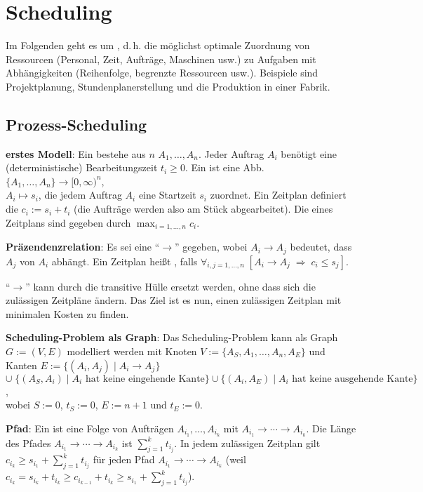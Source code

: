 \section{%
    Scheduling%
}

Im Folgenden geht es um , d.\,h. die möglichst optimale Zuordnung von
Ressourcen (Personal, Zeit, Aufträge, Maschinen usw.) zu Aufgaben mit
Abhängigkeiten (Reihenfolge, begrenzte Ressourcen usw.).
Beispiele sind Projektplanung, Stundenplanerstellung und die Produktion in einer Fabrik.

\subsection{%
    Prozess-Scheduling%
}

\textbf{erstes Modell}:
Ein  bestehe aus $n$  $A_1, \dotsc, A_n$.
Jeder Auftrag $A_i$ benötigt eine (deterministische) Bearbeitungszeit $t_i \ge 0$.
Ein  ist eine Abb. $\{A_1, \dotsc, A_n\} \to [0, \infty)^n$,\\
$A_i \mapsto s_i$, die jedem Auftrag $A_i$ eine Startzeit $s_i$ zuordnet.
Ein Zeitplan definiert die  $c_i := s_i + t_i$
(die Aufträge werden also am Stück abgearbeitet).
Die  eines Zeitplans sind gegeben durch $\max_{i=1,\dotsc,n} c_i$.

\textbf{Präzendenzrelation}:
Es sei eine  "`$\to$"' gegeben,
wobei $A_i \to A_j$ bedeutet, dass $A_j$ von $A_i$ abhängt.
Ein Zeitplan heißt , falls
$\forall_{i,j=1,\dotsc,n}\; [A_i \to A_j \;\Rightarrow\; c_i \le s_j]$.

"`$\to$"' kann durch die transitive Hülle ersetzt werden, ohne dass sich die zulässigen
Zeitpläne ändern.
Das Ziel ist es nun, einen zulässigen Zeitplan mit minimalen Kosten zu finden.

\linie

\textbf{Scheduling-Problem als Graph}:
Das Scheduling-Problem kann als Graph $G := (V, E)$ modelliert werden mit Knoten
$V := \{A_S, A_1, \dotsc, A_n, A_E\}$ und Kanten
$E := \{(A_i, A_j) \;|\; A_i \to A_j\}$\\
$\cup\; \{(A_S, A_i) \;|\; \text{$A_i$ hat keine eingehende Kante}\} \cup
\{(A_i, A_E) \;|\; \text{$A_i$ hat keine ausgehende Kante}\}$,\\
wobei $S := 0$, $t_S := 0$, $E := n+1$ und $t_E := 0$.

\textbf{Pfad}:
Ein  ist eine Folge von Aufträgen $A_{i_1}, \dotsc, A_{i_k}$ mit
$A_{i_1} \to \dotsb \to A_{i_k}$.
Die Länge des Pfades $A_{i_1} \to \dotsb \to A_{i_k}$ ist
$\sum_{j=1}^k t_{i_j}$.
In jedem zulässigen Zeitplan gilt $c_{i_k} \ge s_{i_1} + \sum_{j=1}^k t_{i_j}$
für jeden Pfad $A_{i_1} \to \dotsb \to A_{i_k}$
(weil $c_{i_k} = s_{i_k} + t_{i_k} \ge c_{i_{k-1}} + t_{i_k} \ge s_{i_1} + \sum_{j=1}^k t_{i_j}$).

